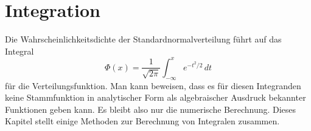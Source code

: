 %
%
%
\chapter{Integration\label{chapter:integration}}
\rhead{}
Die Wahrscheinlichkeitsdichte der Standardnormalverteilung führt 
auf das Integral
\[
\Phi(x) 
=
\frac{1}{\sqrt{2\pi}}
\int_{-\infty}^x e^{-t^2/2}\,dt
\]
für die Verteilungsfunktion.
Man kann beweisen, dass es für diesen Integranden keine Stammfunktion
in analytischer Form als algebraischer Ausdruck bekannter Funktionen
geben kann.
Es bleibt also nur die numerische Berechnung.
Dieses Kapitel stellt einige Methoden zur Berechnung von Integralen
zusammen. 




